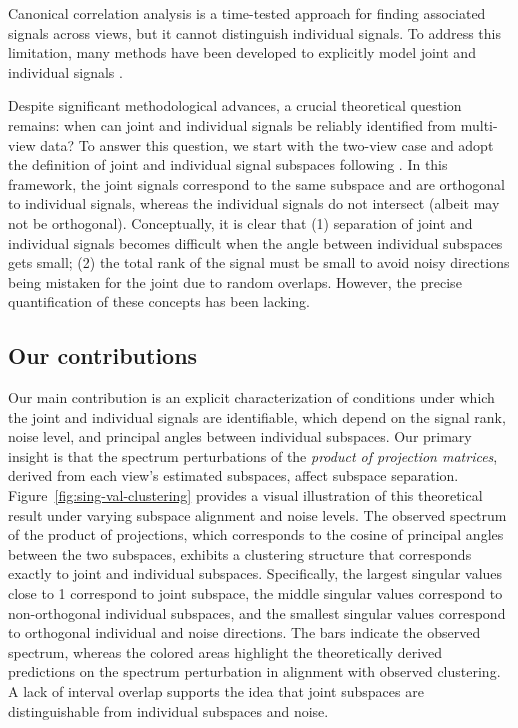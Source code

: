 \documentclass{amsart}
\begin{document}
Canonical correlation analysis \citep{hotelling1992relations} is a time-tested approach for finding associated signals across views, but it cannot distinguish individual signals. To address this limitation, many methods have been developed to explicitly model joint and individual signals \citep{van2009structured, lock2013joint, zhou2015group, yang2016non, feng2018angle, shu2019d, gaynanova2019structural, park2020integrative, murden2022interpretive, prothero2024data, xiaoSparseIntegrativePrincipal2024}.



Despite significant methodological advances, a crucial theoretical question remains: when can joint and individual signals be reliably identified from multi-view data? To answer this question, we start with the two-view case and adopt the definition of joint and individual signal subspaces following \citet{lock2013joint, zhou2015group, feng2018angle}. In this framework, the joint signals correspond to the same subspace and are orthogonal to individual signals, whereas the individual signals do not intersect (albeit may not be orthogonal).
Conceptually, it is clear that (1) separation of joint and individual signals becomes difficult when the angle between individual subspaces gets small; (2) the total rank of the signal must be small to avoid noisy directions being mistaken for the joint due to random overlaps. However, the precise quantification of these concepts has been lacking. 
\subsection{Our contributions}
Our main contribution is an explicit characterization of conditions under which the joint and individual signals are identifiable, which depend on the signal rank, noise level, and principal angles between individual subspaces. Our primary insight is that the spectrum perturbations of the \emph{product of projection matrices}, derived from each view’s estimated subspaces, affect subspace separation. Figure~\ref{fig:sing-val-clustering} provides a visual illustration of this theoretical result under varying subspace alignment and noise levels. The observed spectrum of the product of projections, which corresponds to the cosine of principal angles between the two subspaces, exhibits a clustering structure that corresponds exactly to joint and individual subspaces. Specifically, the largest singular values close to 1 correspond to joint subspace, the middle singular values correspond to non-orthogonal individual subspaces, and the smallest singular values correspond to orthogonal individual and noise directions. The bars indicate the observed spectrum, whereas the colored areas highlight the theoretically derived predictions on the spectrum perturbation in alignment with observed clustering. A lack of interval overlap supports the idea that joint subspaces are distinguishable from individual subspaces and noise.
\end{document}
